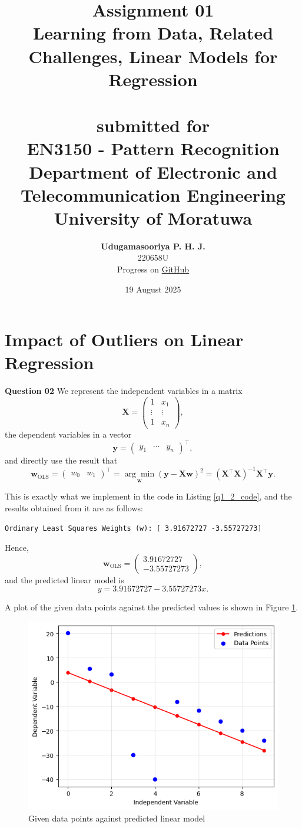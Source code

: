 \documentclass{article}[a4paper]
\title{
	\huge{\textbf{
		Assignment 01
	}}\\
	\Large{
		Learning from Data, Related Challenges, Linear Models for Regression
	}\\
	\large{\phantom{}}\\
	\large{
		submitted for
	}\\
	\LARGE{
		\textbf{EN3150 - Pattern Recognition}
	}\\
	\large{
		Department of Electronic and Telecommunication Engineering
	}
	\\
	\large{University of Moratuwa}
}
\author{
	\textbf{Udugamasooriya P. H. J.}\\
	220658U\\
	\small{Progress on \href{https://github.com/pulasthi-u/en3160-assignment01}{GitHub \extlink}}
}
\date{19 August 2025}
\begin{document}
	\maketitle

	\section{Impact of Outliers on Linear Regression}

	\textbf{Question 02}
	We represent the independent variables in a matrix \[
		\mathbf{X} = \begin{pmatrix}
			1		& x_1		\\
			\vdots	& \vdots	\\
			1		& x_n
		\end{pmatrix},
	\] the dependent variables in a vector \[
		\mathbf{y} = \begin{pmatrix}
			y_1 & \cdots & y_n
		\end{pmatrix} ^ \top,
	\] and directly use the result that \[
		\mathbf{w}_\text{OLS}
		= \begin{pmatrix} w_0 & w_1 \end{pmatrix} ^ \top
		= \underset{\mathbf{w}}{\arg\min} \left( \mathbf{y} - \mathbf{X} \mathbf{w} \right)^2
		= \left( \mathbf{X}^\top \mathbf{X} \right)^{-1} \mathbf{X}^\top \mathbf{y}.
	\]
	
	This is exactly what we implement in the code in Listing \ref{q1_2_code}, and the results obtained
	from it are as follows:
	\begin{verbatim}
Ordinary Least Squares Weights (w): [ 3.91672727 -3.55727273]
	\end{verbatim}

	Hence, \[
		\mathbf{w}_\text{OLS} = \begin{pmatrix} 3.91672727 \\ -3.55727273 \end{pmatrix},
	\] and the predicted linear model is \[
		y = 3.91672727 - 3.55727273 x.
	\]

	A plot of the given data points against the predicted values is shown in Figure \ref{q1_2_img}.

	\begin{figure}[H]
		\centering
		\includegraphics[width=0.9\linewidth]{images/q1_2.png}
		\caption{Given data points against predicted linear model}
		\label{q1_2_img}
	\end{figure}
\end{document}
